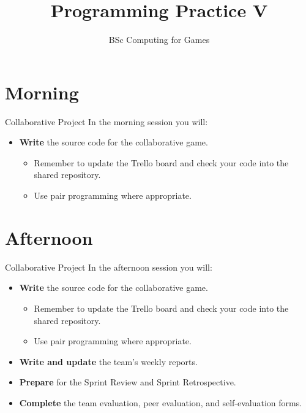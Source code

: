 \documentclass[xcolor={dvipsnames}]{beamer}\usepackage{etoolbox}\newtoggle{printable}\togglefalse{printable}
\begin{document}
\title{Programming Practice V}   
\subtitle{BSc Computing for Games}

\frame{\titlepage} 

\part{Morning}
\frame{\partpage}

\begin{frame}{Collaborative Project}
	In the morning session you will:
	
	\begin{itemize}
		\item \textbf{Write} the source code for the collaborative game.
		\begin{itemize}
			\item Remember to update the Trello board and check your code into the shared repository.
			\item Use pair programming where appropriate.
		\end{itemize}
	\end{itemize}
\end{frame}

\part{Afternoon}
\frame{\partpage}

\begin{frame}{Collaborative Project}
	In the afternoon session you will:
	
	\begin{itemize}
		\item \textbf{Write} the source code for the collaborative game.
		\begin{itemize}
			\item Remember to update the Trello board and check your code into the shared repository.
			\item Use pair programming where appropriate.
		\end{itemize}
		\vspace{2ex}
		\item \textbf{Write and update} the team's weekly reports.
		\item\textbf{Prepare} for the Sprint Review and Sprint Retrospective.
		\item \textbf{Complete} the team evaluation, peer evaluation, and self-evaluation forms.
	\end{itemize}
\end{frame}


%
\end{document}
